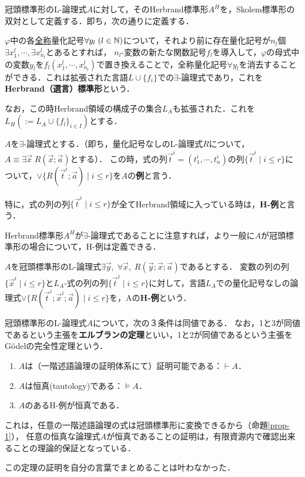 \documentclass[uplatex,dvipdfmx]{jsarticle}
\begin{document}
\begin{definition}
    冠頭標準形のL-論理式$A$に対して，そのHerbrand標準形$A^H$を，Skolem標準形の双対として定義する．即ち，次の通りに定義する．
    
    $\varphi$中の各\underline{全称}量化記号$\forall y_l\;(l\in\mathbb{N})$について，それより前に存在量化記号が$n_l$個$\exists x_1^l,\cdots,\exists x_{n_l}^l$とあるとすれば，
    $n_l$-変数の新たな関数記号$f_l$を導入して，$\varphi$の母式中の変数$y_l$を$f_l(x^l_1,\cdots,x^l_{n_l})$で置き換えることで，全称量化記号$\forall y_l$を消去することができる．これは拡張された言語$L\cup\{f_i\}$での$\exists$-論理式であり，これを\textbf{Herbrand（選言）標準形}という．

    なお，この時Herbrand領域の構成子の集合$L_A$も拡張された．これを$L_H(:=L_A\cup\{f_l\}_{i\in I})$とする．
\end{definition}

\begin{definition}
    $A$を$\exists$-論理式とする．（即ち，量化記号なしのL-論理式$R$について，$A\equiv\exists\vec{x}\;R(\vec{x};\vec{a})$とする）．
    この時，式の列$\vec{t}^i=(t^i_1,\cdots,t^i_n)$の列$\{\vec{t}^i\mid i\le r\}$について，$\lor\{R(\vec{t}^i;\vec{a})\mid i\le r\}$を$A$の\textbf{例}と言う．

    特に，式の列の列$\{\vec{t}^i\mid i\le r\}$が全てHerbrand領域に入っている時は，\textbf{H-例}と言う．
\end{definition}

Herbrand標準形$A^H$が$\exists$-論理式であることに注意すれば，より一般に$A$が冠頭標準形の場合について，H-例は定義できる．

\begin{definition}
    $A$を冠頭標準形のL-論理式$\exists\vec{y},\;\forall\vec{x},\;R(\vec{y};\vec{x};\vec{a})$であるとする．
    変数の列の列$\{\vec{x}^i\mid i\le r\}$と$L_A$-式の列の列$\{\vec{t}^i\mid i\le r\}$に対して，言語$L_A$での量化記号なしの論理式$\lor\{R(\vec{t}^i;\vec{x}^i;\vec{a})\mid i\le r\}$を，Aの\textbf{H-例}という．
\end{definition}

\begin{theorem}\label{thm-1}
    冠頭標準形のL-論理式$A$について，次の３条件は同値である．
    なお，1と3が同値であるという主張を\textbf{エルブランの定理}といい，1と2が同値であるという主張をGödelの完全性定理という．
    \begin{enumerate}
        \item $A$は（一階述語論理の証明体系にて）証明可能である：$\vdash A$．
        \item $A$は恒真(tautology)である：$\vDash A$．
        \item $A$のあるH-例が恒真である．
    \end{enumerate}
\end{theorem}
\begin{remark}
    これは，任意の一階述語論理の式は冠頭標準形に変換できるから（命題\ref{prop-1}），
    任意の恒真な論理式$A$が恒真であることの証明は，有限資源内で確認出来ることの理論的保証となっている．
\end{remark}
この定理の証明を自分の言葉でまとめることは叶わなかった．
\end{document}
